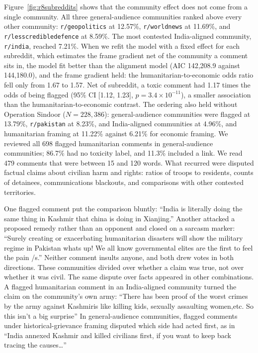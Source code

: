 Figure~\ref{fig:r8subreddits} shows that the community effect does not come from a single community. All three general-audience communities ranked above every other community: \texttt{r/geopolitics} at 12.57\%, \texttt{r/worldnews} at 11.69\%, and \texttt{r/lesscredibledefence} at 8.59\%. The most contested India-aligned community, \texttt{r/india}, reached 7.21\%. When we refit the model with a fixed effect for each subreddit, which estimates the frame gradient net of the community a comment sits in, the model fit better than the alignment model (AIC 142,208.9 against 144,180.0), and the frame gradient held: the humanitarian-to-economic odds ratio fell only from 1.67 to 1.57. Net of subreddit, a toxic comment had 1.17 times the odds of being flagged (95\% CI [1.12, 1.23], $p = 3.4 \times 10^{-11}$), a smaller association than the humanitarian-to-economic contrast. The ordering also held without Operation Sindoor ($N = 228{,}386$): general-audience communities were flagged at 13.79\%, \texttt{r/pakistan} at 8.23\%, and India-aligned communities at 4.96\%, and humanitarian framing at 11.22\% against 6.21\% for economic framing. We reviewed all 698 flagged humanitarian comments in general-audience communities; 86.7\% had no toxicity label, and 11.3\% included a link. We read 479 comments that were between 15 and 120 words. What recurred were disputed factual claims about civilian harm and rights: ratios of troops to residents, counts of detainees, communications blackouts, and comparisons with other contested territories. 

One flagged comment put the comparison bluntly: ``India is literally doing the same thing in Kashmir that china is doing in Xianjing.'' Another attacked a proposed remedy rather than an opponent and closed on a sarcasm marker: ``Surely creating or exacerbating humanitarian disasters will show the military regime in Pakistan whats up! We all know governmental elites are the first to feel the pain /s.'' Neither comment insults anyone, and both drew votes in both directions. These communities divided over whether a claim was true, not over whether it was civil. The same dispute over facts appeared in other combinations. A flagged humanitarian comment in an India-aligned community turned the claim on the community's own army: ``There has been proof of the worst crimes by the army against Kashmiris like killing kids, sexually assaulting women,etc. So this isn't a big surprise'' In general-audience communities, flagged comments under historical-grievance framing disputed which side had acted first, as in ``India annexed Kashmir and killed civilians first, if you want to keep back tracing the causes\ldots''


